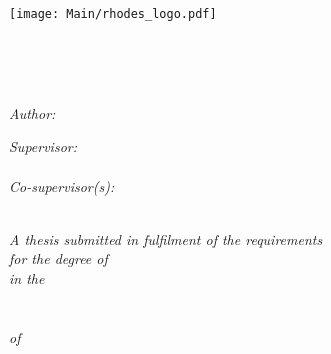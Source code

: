 \documentclass[
11pt, %
english, %
onehalfspacing, %
headsepline, %
]{MastersDoctoralThesis} %
\author{Brian \textsc{Welman}} %
\theoremstyle{customdefstyle}
\begin{document}
\frontmatter %

\pagestyle{plain} %


\begin{titlepage}
\begin{center}

\vspace*{.06\textheight}
\texttt{[image: Main/rhodes\_logo.pdf]}
\vspace*{.06\textheight}

\HRule \\[0.4cm] %
{\LARGE \bfseries \ttitle\par}\vspace{0.4cm} %
\HRule \\[1cm] %
 
\begin{minipage}[t]{0.3\textwidth}
\begin{flushleft} \large
\emph{Author:}\\
{\authorname} %
\end{flushleft}
\end{minipage}
\begin{minipage}[t]{0.6\textwidth}
\begin{flushright} \large
\emph{Supervisor:} \\
{\supname} \\
\emph{Co-supervisor(s):} \\ 
\cosupname %
\end{flushright}
\end{minipage}\\[1cm]
 

\large \textit{A thesis submitted in fulfilment of the requirements\\ for the degree of }\degreename \\[0.3cm] %
\textit{in the}\\[0.3cm]
\groupname\\\deptname\\[0.3cm] %
\textit{of}\\[0.3cm]
\univname\\[0.3cm]


\end{center}
\end{titlepage}
\end{document}
